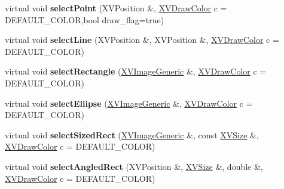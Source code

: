 \begin{CompactItemize}
\item 
\label{XVThreadedWindowX_a7}
\hypertarget{class_XVThreadedWindowX_a7}{
virtual void {\bf select\-Point} (XVPosition \&, \hyperlink{class_XVDrawColor}{XVDraw\-Color} c = DEFAULT\_\-COLOR,bool draw\_\-flag=true)}

\item 
\label{XVThreadedWindowX_a8}
\hypertarget{class_XVThreadedWindowX_a8}{
virtual void {\bf select\-Line} (XVPosition \&, XVPosition \&, \hyperlink{class_XVDrawColor}{XVDraw\-Color} c = DEFAULT\_\-COLOR)}

\item 
\label{XVThreadedWindowX_a9}
\hypertarget{class_XVThreadedWindowX_a9}{
virtual void {\bf select\-Rectangle} (\hyperlink{class_XVImageGeneric}{XVImage\-Generic} \&, \hyperlink{class_XVDrawColor}{XVDraw\-Color} c = DEFAULT\_\-COLOR)}

\item 
\label{XVThreadedWindowX_a10}
\hypertarget{class_XVThreadedWindowX_a10}{
virtual void {\bf select\-Ellipse} (\hyperlink{class_XVImageGeneric}{XVImage\-Generic} \&, \hyperlink{class_XVDrawColor}{XVDraw\-Color} c = DEFAULT\_\-COLOR)}

\item 
\label{XVThreadedWindowX_a11}
\hypertarget{class_XVThreadedWindowX_a11}{
virtual void {\bf select\-Sized\-Rect} (\hyperlink{class_XVImageGeneric}{XVImage\-Generic} \&, const \hyperlink{class_XVSize}{XVSize} \&, \hyperlink{class_XVDrawColor}{XVDraw\-Color} c = DEFAULT\_\-COLOR)}

\item 
\label{XVThreadedWindowX_a12}
\hypertarget{class_XVThreadedWindowX_a12}{
virtual void {\bf select\-Angled\-Rect} (XVPosition \&, \hyperlink{class_XVSize}{XVSize} \&, double \&, \hyperlink{class_XVDrawColor}{XVDraw\-Color} c = DEFAULT\_\-COLOR)}

\end{CompactItemize}
